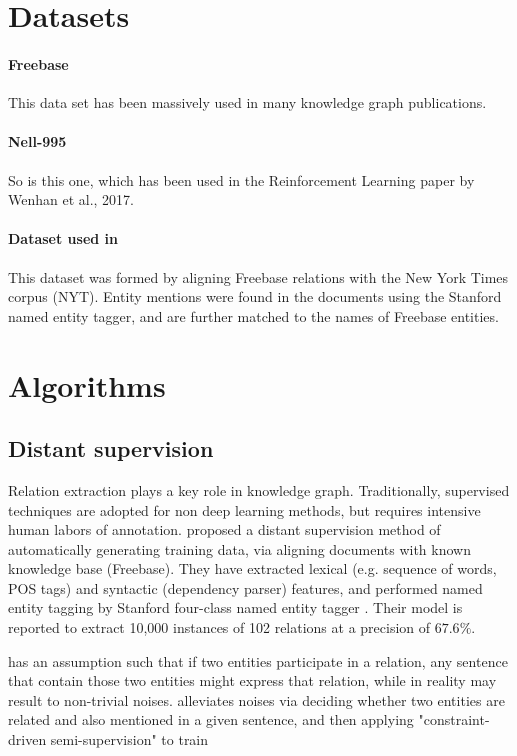 \documentclass{article}
\begin{document}
\section{Datasets}
	
	\paragraph{Freebase} This data set has been massively used in many knowledge graph publications.
	
	\paragraph{Nell-995} So is this one, which has been used in the Reinforcement Learning paper by Wenhan et al., 2017.
	
	\paragraph{Dataset used in \citet{Riedel2010}} This dataset was formed by aligning Freebase relations with the New York Times corpus (NYT). Entity mentions were found in the documents using the Stanford named entity tagger, and are further matched to the names of Freebase entities.

\section{Algorithms}

\subsection{Distant supervision}
	Relation extraction plays a key role in knowledge graph. Traditionally, supervised techniques are adopted for non deep learning methods, but requires intensive human labors of annotation. \citet{Mintz:2009:DSR:1690219.1690287} proposed a distant supervision method of automatically generating training data, via aligning documents with known knowledge base (Freebase). They have extracted lexical (e.g. sequence of words, POS tags) and syntactic (dependency parser) features, and performed named entity tagging by Stanford four-class named entity tagger \citet{Finkel:2005:INI:1219840.1219885}. Their model is reported to extract 10,000 instances of 102 relations at a precision of $67.6\%$.
	
	\citet{Mintz:2009:DSR:1690219.1690287} has an assumption such that if two entities participate in a relation, any sentence that contain those two entities might express that relation, while in reality may result to non-trivial noises. \citet{Riedel2010} alleviates noises via deciding whether two entities are related and also mentioned in a given sentence, and then applying "constraint-driven semi-supervision" to train
\end{document}
